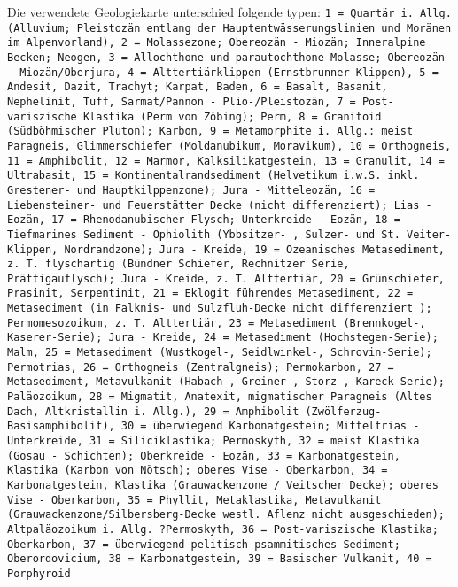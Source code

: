 \documentclass[twocolumn]{scrartcl}
\begin{document}
Die verwendete Geologiekarte unterschied folgende typen: \texttt{1 =
  Quartär i. Allg. (Alluvium; Pleistozän entlang der
  Hauptentwässerungslinien und Moränen im Alpenvorland), 2 =
  Molassezone; Obereozän - Miozän; Inneralpine Becken; Neogen, 3 =
  Allochthone und parautochthone Molasse; Obereozän - Miozän/Oberjura,
  4 = Alttertiärklippen (Ernstbrunner Klippen), 5 = Andesit, Dazit,
  Trachyt; Karpat, Baden, 6 = Basalt, Basanit, Nephelinit, Tuff,
  Sarmat/Pannon - Plio-/Pleistozän, 7 = Post-variszische Klastika
  (Perm von Zöbing); Perm, 8 = Granitoid (Südböhmischer Pluton);
  Karbon, 9 = Metamorphite i. Allg.: meist Paragneis, Glimmerschiefer
  (Moldanubikum, Moravikum), 10 = Orthogneis, 11 = Amphibolit, 12 =
  Marmor, Kalksilikatgestein, 13 = Granulit, 14 = Ultrabasit, 15 =
  Kontinentalrandsediment (Helvetikum i.w.S. inkl. Grestener- und
  Hauptkilppenzone); Jura - Mitteleozän, 16 = Liebensteiner- und
  Feuerstätter Decke (nicht differenziert); Lias - Eozän, 17 =
  Rhenodanubischer Flysch; Unterkreide - Eozän, 18 = Tiefmarines
  Sediment - Ophiolith (Ybbsitzer- , Sulzer- und St. Veiter-Klippen,
  Nordrandzone); Jura - Kreide, 19 = Ozeanisches Metasediment,
  z. T. flyschartig (Bündner Schiefer, Rechnitzer Serie,
  Prättigauflysch); Jura - Kreide, z. T. Alttertiär, 20 =
  Grünschiefer, Prasinit, Serpentinit, 21 = Eklogit führendes
  Metasediment, 22 = Metasediment (in Falknis- und Sulzfluh-Decke
  nicht differenziert ); Permomesozoikum, z. T. Alttertiär, 23 =
  Metasediment (Brennkogel-, Kaserer-Serie); Jura - Kreide, 24 =
  Metasediment (Hochstegen-Serie); Malm, 25 = Metasediment
  (Wustkogel-, Seidlwinkel-, Schrovin-Serie); Permotrias, 26 =
  Orthogneis (Zentralgneis); Permokarbon, 27 = Metasediment,
  Metavulkanit (Habach-, Greiner-, Storz-, Kareck-Serie); Paläozoikum,
  28 = Migmatit, Anatexit, migmatischer Paragneis (Altes Dach,
  Altkristallin i. Allg.), 29 = Amphibolit
  (Zwölferzug-Basisamphibolit), 30 = überwiegend Karbonatgestein;
  Mitteltrias - Unterkreide, 31 = Siliciklastika; Permoskyth, 32 =
  meist Klastika (Gosau - Schichten); Oberkreide - Eozän, 33 =
  Karbonatgestein, Klastika (Karbon von Nötsch); oberes Vise -
  Oberkarbon, 34 = Karbonatgestein, Klastika (Grauwackenzone /
  Veitscher Decke); oberes Vise - Oberkarbon, 35 = Phyllit,
  Metaklastika, Metavulkanit (Grauwackenzone/Silbersberg-Decke
  westl. Aflenz nicht ausgeschieden); Altpaläozoikum
  i. Allg. ?Permoskyth, 36 = Post-variszische Klastika; Oberkarbon, 37
  = überwiegend pelitisch-psammitisches Sediment; Oberordovicium, 38 =
  Karbonatgestein, 39 = Basischer Vulkanit, 40 = Porphyroid
}
\end{document}
